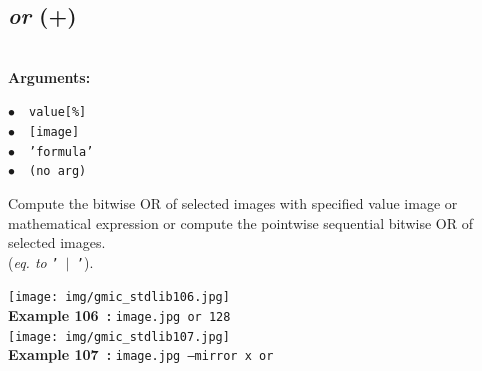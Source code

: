 \documentclass[a4paper,10.5pt,twoside]{book}
\def\comma{\discretionary{,}{}{,}}
\newcommand{\Cb}[1]{\textcolor{cb}{#1}}
\begin{document}
\subsection{\emph{or} (+)}\vspace*{-0.7em}
~\\\textbf{\Cb{Arguments: }}\begin{flushleft}
{\small \Cb{\hspace*{0.5cm}$\bullet$~~\texttt{value[\%]}}}~~~\\
{\small \Cb{\hspace*{0.5cm}$\bullet$~~\texttt{[image]}}}~~~\\
{\small \Cb{\hspace*{0.5cm}$\bullet$~~\texttt{'formula'}}}~~~\\
{\small \Cb{\hspace*{0.5cm}$\bullet$~~\texttt{(no arg)}}}\end{flushleft}
Compute the bitwise OR of selected images with specified value{\comma} image or mathematical
expression{\comma} or compute the pointwise sequential bitwise OR of selected images.
~\\(\emph{eq. to} {\small \texttt{'~$|$~'}}).
\begin{center}\texttt{[image: img/gmic\_stdlib106.jpg]}\\
{\footnotesize \textbf{Example 106~:} \texttt{image.jpg or 128}}
\\\texttt{[image: img/gmic\_stdlib107.jpg]}\\
{\footnotesize \textbf{Example 107~:} \texttt{image.jpg --mirror x or}}
\end{center}
\end{document}
